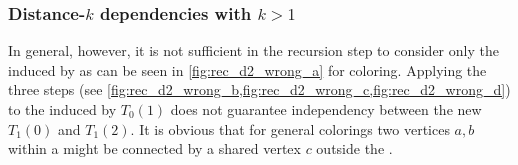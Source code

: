	\subsubsection{Distance-$k$ dependencies with $k>1$}  \label{subsec:Dk_dependency}
In general, however, it is not sufficient in the recursion step to consider only the \subgraphs induced by \levelGroups as can be seen in \cref{fig:rec_d2_wrong_a} for \DTWO coloring. Applying  the three steps (see \cref{fig:rec_d2_wrong_b,fig:rec_d2_wrong_c,fig:rec_d2_wrong_d})  to  the \subgraph induced by $T_0(1)$ does not guarantee \DTWO independency between the new \levelGroups $T_1(0)$ and $T_1(2)$. It is obvious that for general \DK colorings two vertices $a,b$ within a \levelGroup might be connected by a shared vertex $c$ outside the \levelGroup. 
